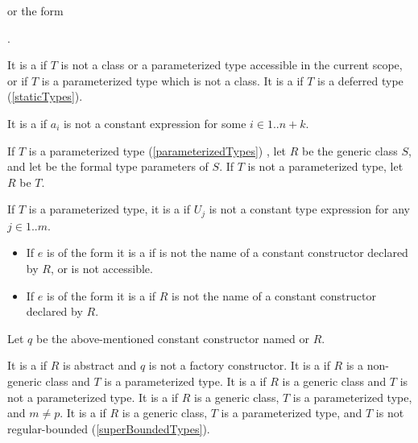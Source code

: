 \documentclass[makeidx]{article}
\begin{document}
{\noindent
{}
or the form

\noindent
{}.

\LMHash{}%
It is a  if $T$ is not
a class or a parameterized type accessible in the current scope,
or if $T$ is a parameterized type which is not a class.
It is a  if $T$ is a deferred type
(\ref{staticTypes}).

\LMHash{}%
It is a  if $a_i$ is not a constant expression
for some $i \in 1 .. n + k$.

\LMHash{}%
If $T$ is a parameterized type (\ref{parameterizedTypes})
,
let $R$ be the generic class $S$,
and let
be the formal type parameters of $S$.
If $T$ is not a parameterized type, let $R$ be $T$.

\LMHash{}%
If $T$ is a parameterized type,
it is a
 if $U_j$ is not a constant type expression for any
$j \in 1 .. m$.

\begin{itemize}
\item
  If $e$ is of the form
  it is a  if  is not the name of
  a constant constructor declared by $R$, or \id{} is not accessible.
\item
  If $e$ is of the form
  it is a  if $R$ is not the name of
  a constant constructor declared by $R$.
\end{itemize}

\LMHash{}%
Let $q$ be the above-mentioned constant constructor named  or $R$.

\LMHash{}%
It is a  if $R$ is abstract
and $q$ is not a factory constructor.
It is a  if $R$ is a non-generic class
and $T$ is a parameterized type.
It is a  if $R$ is a generic class
and $T$ is not a parameterized type.
It is a  if $R$ is a generic class,
$T$ is a parameterized type, and $m \not= p$.
It is a  if $R$ is a generic class,
$T$ is a parameterized type,
and $T$ is not regular-bounded
(\ref{superBoundedTypes}).

}
\end{document}
